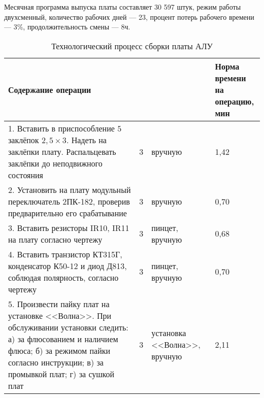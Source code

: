 Месячная программа выпуска платы составляет 30 597 штук,
режим работы двухсменный, количество рабочих дней --- 23,
процент потерь рабочего времени --- 3\%, продолжительность смены --- 8ч.

\newpage

\begin{table} [h!]
  \caption{
    Технологический процесс сборки платы АЛУ
  }\label{tbl:assembly_process}
  {\small
    \begin{tabular}{| m{10cm} | m{0.4cm} | m{3cm} | m{1.3cm} |}
      \hline
      Содержание операции &
      \rotatebox[origin=c]{90}{\hspace{2mm}\parbox{3.3cm}{Разряд работ}} &
      \rotatebox[origin=c]{90}{\hspace{2mm}\parbox{3.3cm}{Приспособление, инструмент, оборудование}} &
      \rotatebox[origin=c]{90}{\hspace{2mm}\parbox{3.3cm}{Норма времени \\ на операцию, \\ мин}} \\ \hline

      1. Вставить в приспособление $5$ заклёпок $2{,}5 \times 3$. Надеть на
      заклёпки плату. Распальцевать заклёпки до неподвижного состояния &
      3 & вручную & 1,42 \\ \hline

      2. Установить на плату модульный переключатель 2ПК-182, проверив
      предварительно его срабатывание &
      3 & вручную & 0,70 \\ \hline

      3. Вставить резисторы IR10, IR11 на плату согласно чертежу &
      3 & пинцет, вручную & 0,68 \\ \hline

      4. Вставить транзистор КТ315Г, конденсатор К50-12 и диод Д813, соблюдая
      полярность, согласно чертежу &
      3 & пинцет, вручную & 0,70 \\ \hline

      5. Произвести пайку плат на установке <<Волна>>. \newline
      При обслуживании установки следить: \newline
      а) за флюсованием и наличием флюса; \newline
      б) за режимом пайки согласно инструкции; \newline
      в) за промывкой плат; \newline
      г) за сушкой плат &
      3 & установка <<Волна>>, вручную & 2,11 \\ \hline


\end{tabular}}
\end{table}
